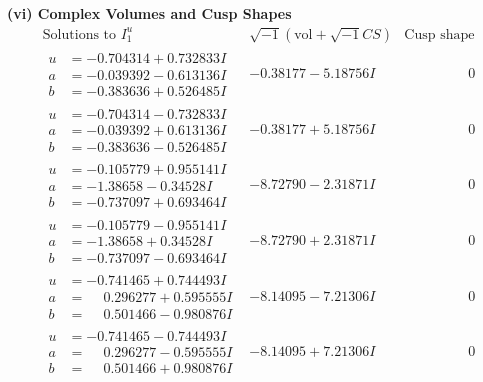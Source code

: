 \documentclass[1p]{elsarticle_modified}
\theoremstyle{definition}
\newcommand{\I}{\sqrt{-1}}
\begin{document}
\newpage\flushleft \textbf{(vi) Complex Volumes and Cusp Shapes}
$$\begin{array}{c|c|c}  
\text{Solutions to }I^u_{1}& \I (\text{vol} + \sqrt{-1}CS) & \text{Cusp shape}\\
 \hline 
\begin{aligned}
u &= -0.704314 + 0.732833 I \\
a &= -0.039392 - 0.613136 I \\
b &= -0.383636 + 0.526485 I\end{aligned}
 & -0.38177 - 5.18756 I & \phantom{-0.000000 } 0 \\ \hline\begin{aligned}
u &= -0.704314 - 0.732833 I \\
a &= -0.039392 + 0.613136 I \\
b &= -0.383636 - 0.526485 I\end{aligned}
 & -0.38177 + 5.18756 I & \phantom{-0.000000 } 0 \\ \hline\begin{aligned}
u &= -0.105779 + 0.955141 I \\
a &= -1.38658 - 0.34528 I \\
b &= -0.737097 + 0.693464 I\end{aligned}
 & -8.72790 - 2.31871 I & \phantom{-0.000000 } 0 \\ \hline\begin{aligned}
u &= -0.105779 - 0.955141 I \\
a &= -1.38658 + 0.34528 I \\
b &= -0.737097 - 0.693464 I\end{aligned}
 & -8.72790 + 2.31871 I & \phantom{-0.000000 } 0 \\ \hline\begin{aligned}
u &= -0.741465 + 0.744493 I \\
a &= \phantom{-}0.296277 + 0.595555 I \\
b &= \phantom{-}0.501466 - 0.980876 I\end{aligned}
 & -8.14095 - 7.21306 I & \phantom{-0.000000 } 0 \\ \hline\begin{aligned}
u &= -0.741465 - 0.744493 I \\
a &= \phantom{-}0.296277 - 0.595555 I \\
b &= \phantom{-}0.501466 + 0.980876 I\end{aligned}
 & -8.14095 + 7.21306 I & \phantom{-0.000000 } 0 \\ \hline\begin{aligned}

\end{aligned}
\end{array}$$
\end{document}
